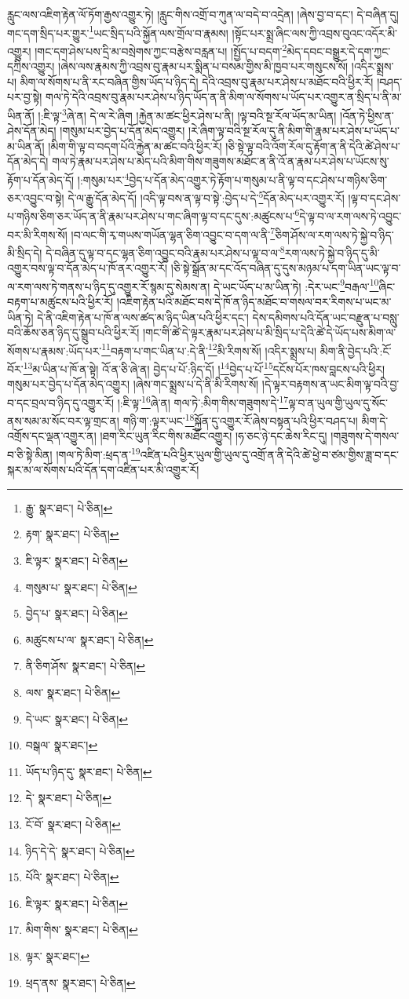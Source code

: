 རླུང་ལས་འཇིག་རྟེན་ལོ་ཏོག་རྒྱས་འགྱུར་ཏེ། །རླུང་གིས་འགྲོ་བ་ཀུན་ལ་བདེ་བ་འདྲེན། །ཞེས་བྱ་བ་དང་། དེ་བཞིན་དུ། གང་དག་སྲིད་པར་གྱུར་\footnote{རྒྱུ་  སྣར་ཐང་།  པེ་ཅིན། }ཡང་སྲིད་པའི་སྐྱོན་ལས་གྲོལ་བ་རྣམས། །སྟོང་པར་སྨྲ་ཞིང་ལས་ཀྱི་འབྲས་བུའང་འདོར་མི་འགྱུར། །གང་དག་ཤེས་པས་དྲི་མ་བསྲེགས་ཀྱང་བརྩེས་བརླན་པ། །སྤྱོད་པ་བདག་\footnote{རྟག་  སྣར་ཐང་།  པེ་ཅིན། }མེད་དབང་བསྒྱུར་དེ་དག་ཀྱང་དཀྲིས་འགྱུར། །ཞེས་ལས་རྣམས་ཀྱི་འབྲས་བུ་རྣམ་པར་སྨིན་པ་བསམ་གྱིས་མི་ཁྱབ་པར་གསུངས་སོ། །འདིར་སྨྲས་པ། མིག་ལ་སོགས་པ་ནི་རང་བཞིན་གྱིས་ཡོད་པ་ཉིད་དེ། དེའི་འབྲས་བུ་རྣམ་པར་ཤེས་པ་མཐོང་བའི་ཕྱིར་རོ། །བཤད་པར་བྱ་སྟེ། གལ་ཏེ་དེའི་འབྲས་བུ་རྣམ་པར་ཤེས་པ་ཉིད་ཡོད་ན་ནི་མིག་ལ་སོགས་པ་ཡོད་པར་འགྱུར་ན་སྲིད་པ་ནི་མ་ཡིན་ནོ། །:ཇི་ལྟ་\footnote{ཇི་ལྟར་  སྣར་ཐང་།  པེ་ཅིན། }ཞེ་ན། དེ་ལ་རེ་ཞིག །རྐྱེན་མ་ཚང་ཕྱིར་ཤེས་པ་ནི། །ལྟ་བའི་སྔ་རོལ་ཡོད་མ་ཡིན། །འོན་ཏེ་ཕྱིས་ན་ཤེས་དོན་མེད། །གསུམ་པར་བྱེད་པ་དོན་མེད་འགྱུར། །རེ་ཞིག་ལྟ་བའི་སྔ་རོལ་དུ་ནི་མིག་གི་རྣམ་པར་ཤེས་པ་ཡོད་པ་མ་ཡིན་ནོ། །མིག་གི་ལྟ་བ་བདག་པོའི་རྐྱེན་མ་ཚང་བའི་ཕྱིར་རོ། །ཅི་སྟེ་ལྟ་བའི་འོག་རོལ་དུ་རྟོག་ན་ནི་དེའི་ཚེ་ཤེས་པ་དོན་མེད་དེ། གལ་ཏེ་རྣམ་པར་ཤེས་པ་མེད་པའི་མིག་གིས་གཟུགས་མཐོང་ན་ནི་འོ་ན་རྣམ་པར་ཤེས་པ་ཡོངས་སུ་རྟོག་པ་དོན་མེད་དོ། །:གསུམ་པར་\footnote{གསུམ་པ་  སྣར་ཐང་།  པེ་ཅིན། }བྱེད་པ་དོན་མེད་འགྱུར་ཏེ་རྟོག་པ་གསུམ་པ་ནི་ལྟ་བ་དང་ཤེས་པ་གཉིས་ཅིག་ཅར་འབྱུང་བ་སྟེ། དེ་ལ་རྒྱུ་དོན་མེད་དོ། །འདི་ལྟ་བས་ན་ལྟ་བ་སྟེ་:བྱེད་པ་དེ་\footnote{བྱེད་པ་  སྣར་ཐང་།  པེ་ཅིན། }དོན་མེད་པར་འགྱུར་རོ། །ལྟ་བ་དང་ཤེས་པ་གཉིས་ཅིག་ཅར་ཡོད་ན་ནི་རྣམ་པར་ཤེས་པ་གང་ཞིག་ལྟ་བ་དང་དུས་:མཚུངས་པ་\footnote{མཚུངས་པ་ལ་  སྣར་ཐང་།  པེ་ཅིན། }དེ་ལྟ་བ་ལ་རག་ལས་ཏེ་འབྱུང་བར་མི་རིགས་སོ། །བ་ལང་གི་རྭ་གཡས་གཡོན་ལྷན་ཅིག་འབྱུང་བ་དག་ལ་ནི་\footnote{ནི་ཅིག་ཤོས་  སྣར་ཐང་།  པེ་ཅིན། }ཅིག་ཤོས་ལ་རག་ལས་ཏེ་སྐྱེ་བ་ཉིད་མི་སྲིད་དེ། དེ་བཞིན་དུ་ལྟ་བ་དང་ལྷན་ཅིག་འབྱུང་བའི་རྣམ་པར་ཤེས་པ་ལྟ་བ་ལ་\footnote{ལས་  སྣར་ཐང་།  པེ་ཅིན། }རག་ལས་ཏེ་སྐྱེ་བ་ཉིད་དུ་མི་འགྱུར་བས་ལྟ་བ་དོན་མེད་པ་ཁོ་ནར་འགྱུར་རོ། །ཅི་སྟེ་སྒྲོན་མ་དང་འོད་བཞིན་དུ་དུས་མཉམ་པ་དག་ཡིན་ཡང་ལྟ་བ་ལ་རག་ལས་ཏེ་གནས་པ་ཉིད་དུ་འགྱུར་རོ་སྙམ་དུ་སེམས་ན། དེ་ཡང་ཡོད་པ་མ་ཡིན་ཏེ། :དེར་ཡང་\footnote{དེ་ཡང་  སྣར་ཐང་།  པེ་ཅིན། }བརྒལ་\footnote{བསྒལ་  སྣར་ཐང་། }ཞིང་བརྟག་པ་མཚུངས་པའི་ཕྱིར་རོ། །འཇིག་རྟེན་པའི་མཐོང་བས་དེ་ཁོ་ན་ཉིད་མཐོང་བ་གསལ་བར་རིགས་པ་ཡང་མ་ཡིན་ཏེ། དེ་ནི་འཇིག་རྟེན་པ་ཁོ་ན་ལས་ཚད་མ་ཉིད་ཡིན་པའི་ཕྱིར་དང་། དེས་དམིགས་པའི་དོན་ཡང་བརྫུན་པ་བསླུ་བའི་ཆོས་ཅན་ཉིད་དུ་སྒྲུབ་པའི་ཕྱིར་རོ། །གང་གི་ཚེ་དེ་ལྟར་རྣམ་པར་ཤེས་པ་མི་སྲིད་པ་དེའི་ཚེ་དེ་ཡོད་པས་མིག་ལ་སོགས་པ་རྣམས་:ཡོད་པར་\footnote{ཡོད་པ་ཉིད་དུ་  སྣར་ཐང་།  པེ་ཅིན། }བརྟག་པ་གང་ཡིན་པ་:དེ་ནི་\footnote{དེ་  སྣར་ཐང་།  པེ་ཅིན། }མི་རིགས་སོ། །འདིར་སྨྲས་པ། མིག་ནི་བྱེད་པའི་:ངོ་བོར་\footnote{ངོ་བོ་  སྣར་ཐང་།  པེ་ཅིན། }མ་ཡིན་པ་ཁོ་ན་སྟེ། འོ་ན་ཅི་ཞེ་ན། བྱེད་པ་པོ་:ཉིད་དོ། །\footnote{ཉིད་དེ་དེ་  སྣར་ཐང་།  པེ་ཅིན། }བྱེད་པ་པོ་\footnote{པོའི་  སྣར་ཐང་།  པེ་ཅིན། }དངོས་པོར་ཁས་བླངས་པའི་ཕྱིར། གསུམ་པར་བྱེད་པ་དོན་མེད་འགྱུར། །ཞེས་གང་སྨྲས་པ་དེ་ནི་མི་རིགས་སོ། །དེ་ལྟར་བརྟགས་ན་ཡང་མིག་ལྟ་བའི་བྱ་བ་དང་བྲལ་བ་ཉིད་དུ་འགྱུར་རོ། །:ཇི་ལྟ་\footnote{ཇི་ལྟར་  སྣར་ཐང་།  པེ་ཅིན། }ཞེ་ན། གལ་ཏེ་:མིག་གིས་གཟུགས་དེ་\footnote{མིག་གིས་  སྣར་ཐང་།  པེ་ཅིན། }ལྟ་བ་ན་ཡུལ་གྱི་ཡུལ་དུ་སོང་ནས་སམ་མ་སོང་བར་ལྟ་གྲང་ན། གཉི་ག་:ལྟར་ཡང་\footnote{ལྟར་  སྣར་ཐང་། }སྐྱོན་དུ་འགྱུར་རོ་ཞེས་བསྟན་པའི་ཕྱིར་བཤད་པ། མིག་དེ་འགྲོས་དང་ལྡན་འགྱུར་ན། །ཐག་རིང་ཡུན་རིང་གིས་མཐོང་འགྱུར། །ཧ་ཅང་ཉེ་དང་ཆེས་རིང་དུ། །གཟུགས་དེ་གསལ་བ་ཅི་སྟེ་མིན། །གལ་ཏེ་མིག་:ཕྲད་ན་\footnote{ཕྲད་ནས་  སྣར་ཐང་།  པེ་ཅིན། }འཛིན་པའི་ཕྱིར་ཡུལ་གྱི་ཡུལ་དུ་འགྲོ་ན་ནི་དེའི་ཚེ་ཕྱེ་བ་ཙམ་གྱིས་ཟླ་བ་དང་སྐར་མ་ལ་སོགས་པའི་དོན་དག་འཛིན་པར་མི་འགྱུར་རོ། 